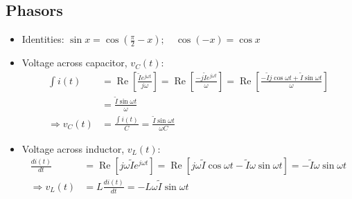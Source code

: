 \documentclass[a4paper]{article}
\begin{document}
\subsection{Phasors}
\begin{itemize}
    \item Identities: $\sin x = \cos\left(\displaystyle\frac{\pi}{2}-x\right);\quad\cos(-x) = \cos x$
    \item Voltage across capacitor, $v_C(t)$:
    \begin{align*}
        \int i(t) &= \operatorname{Re}\left[\frac{\widetilde{I}e^{j\omega t}}{j\omega}\right] =  \operatorname{Re}\left[\frac{-j\widetilde{I}e^{j\omega t}}{\omega}\right]=\operatorname{Re}\left[\frac{-\widetilde{I}j\cos\omega t+\widetilde{I}\sin\omega t}{\omega}\right]\\
        &= \frac{\widetilde{I}\sin\omega t}{\omega}\\
        \Rightarrow v_C(t) &= \frac{\int i(t)}{C} = \frac{\widetilde{I}\sin\omega t}{\omega C}
    \end{align*}
    \item Voltage across inductor, $v_L(t)$:
    \begin{align*}
        \frac{di(t)}{dt} &= \operatorname{Re}\left[j\omega \widetilde{I}e^{j\omega t}\right] = \operatorname{Re}\left[j\omega\widetilde{I}\cos\omega t-\widetilde{I}\omega\sin\omega t\right] = -\widetilde{I}\omega \sin\omega t\\
        \Rightarrow v_L(t) &= L\frac{di(t)}{dt} = -L\omega\widetilde{I}\sin\omega t
    \end{align*}
\end{itemize}
\end{document}
